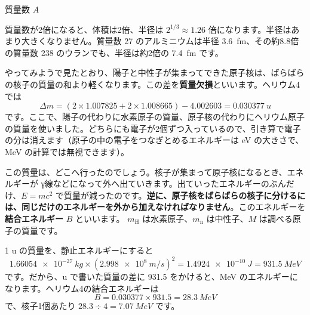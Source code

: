 \begin{phbaisuru}{質量数 $A$}
\noindent\begin{minipage}[c]{0.55\linewidth}\raggedright
質量数が2倍になると、体積は2倍、半径は $2^{1/3}\approx1.26$ 倍になります。半径はあまり大きくなりません。質量数 27 のアルミニウムは半径 \qty{3.6}{fm}、その約8.8倍の質量数 238 のウランでも、半径は約2倍の \qty{7.4}{fm} です。
\end{minipage}\hfill
\begin{minipage}[c]{0.42\linewidth}\centering
{}
\end{minipage}
\end{phbaisuru}

\label{ph:原-11:sec4}
やってみようで見たとおり、陽子と中性子が集まってできた原子核は、ばらばらの核子の質量の和より軽くなります。この差を\textbf{質量欠損}といいます。ヘリウム4では
\[ \Delta m=(2\times1.007825+2\times1.008665)-4.002603=\qty{0.030377}{u} \]
です。ここで、陽子の代わりに水素原子の質量、原子核の代わりにヘリウム原子の質量を使いました。どちらにも電子が2個ずつ入っているので、引き算で電子の分は消えます（原子の中の電子をつなぎとめるエネルギーは eV の大きさで、MeV の計算では無視できます）。

この質量は、どこへ行ったのでしょう。核子が集まって原子核になるとき、エネルギーが γ線などになって外へ出ていきます。出ていったエネルギーのぶんだけ、$E=mc^2$ で質量が減ったのです。\textbf{逆に、原子核をばらばらの核子に分けるには、同じだけのエネルギーを外から加えなければなりません}。このエネルギーを\textbf{結合エネルギー} $B$ といいます。
$m_{\mathrm H}$ は水素原子、$m_{\mathrm n}$ は中性子、$M$ は調べる原子の質量です。

1 u の質量を、静止エネルギーにすると
\[ \qty{1.66054e-27}{kg}\times(\qty{2.998e8}{m/s})^2=\qty{1.4924e-10}{J}=\qty{931.5}{MeV} \]
です。だから、u で書いた質量の差に 931.5 をかけると、MeV のエネルギーになります。ヘリウム4の結合エネルギーは
\[ B=0.030377\times931.5=\qty{28.3}{MeV} \]
で、核子1個あたり $28.3\div4=\qty{7.07}{MeV}$ です。

